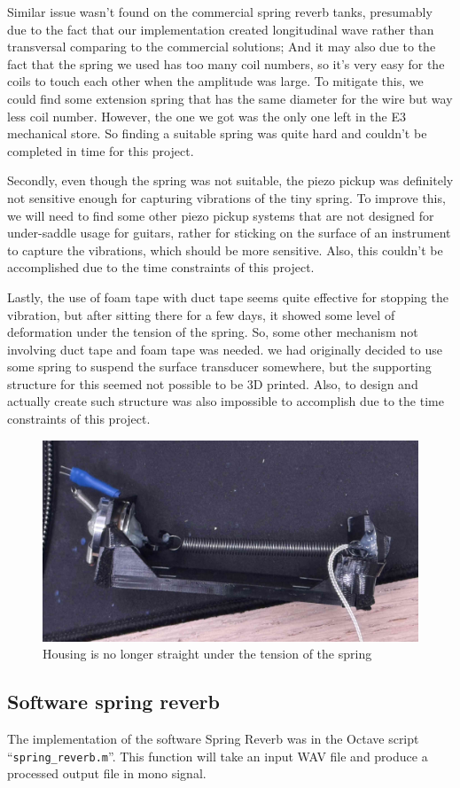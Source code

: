 \documentclass[12pt]{article}
\begin{document}
Similar issue wasn't found on the commercial spring reverb tanks, presumably due to the fact that our implementation created longitudinal wave rather than transversal comparing to the commercial solutions; And it may also due to the fact that the spring we used has too many coil numbers, so it's very easy for the coils to touch each other when the amplitude was large. To mitigate this, we could find some extension spring that has the same diameter for the wire but way less coil number. However, the one we got was the only one left in the E3 mechanical store. So finding a suitable spring was quite hard and couldn't be completed in time for this project. 

Secondly, even though the spring was not suitable, the piezo pickup was definitely not sensitive enough for capturing vibrations of the tiny spring. To improve this, we will need to find some other piezo pickup systems that are not designed for under-saddle usage for guitars, rather for sticking on the surface of an instrument to capture the vibrations, which should be more sensitive. Also, this couldn't be accomplished due to the time constraints of this project.

Lastly, the use of foam tape with duct tape seems quite effective for stopping the vibration, but after sitting there for a few days, it showed some level of deformation under the tension of the spring. So, some other mechanism not involving duct tape and foam tape was needed. we had originally decided to use some spring to suspend the surface transducer somewhere, but the supporting structure for this seemed not possible to be 3D printed. Also, to design and actually create such structure was also impossible to accomplish due to the time constraints of this project.

\begin{figure}[h] 
	\center 
	\includegraphics[width=0.5\linewidth]{photos/deformation.jpg} 
	\caption{Housing is no longer straight under the tension of the spring} 
\end{figure} 

\newpage
\subsection{Software spring reverb}
The implementation of the software Spring Reverb was in the Octave script ``\texttt{spring\_reverb.m}''. This function will take an input WAV file and produce a processed output file in mono signal. 
\end{document}
